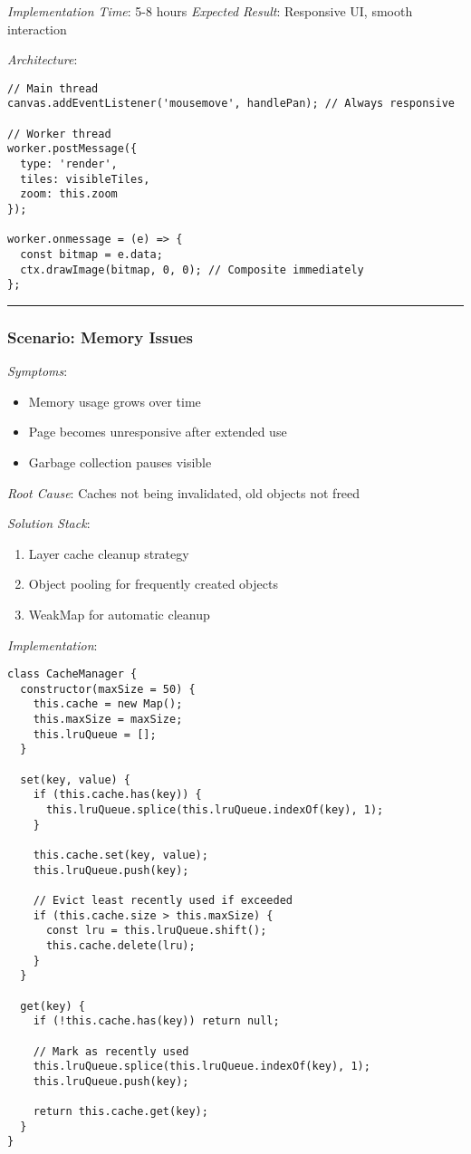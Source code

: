\documentclass[11pt]{article}
\begin{document}
\emph{Implementation Time}: 5-8 hours
\emph{Expected Result}: Responsive UI, smooth interaction

\emph{Architecture}:
\begin{verbatim}
// Main thread
canvas.addEventListener('mousemove', handlePan); // Always responsive

// Worker thread
worker.postMessage({ 
  type: 'render',
  tiles: visibleTiles,
  zoom: this.zoom
});

worker.onmessage = (e) => {
  const bitmap = e.data;
  ctx.drawImage(bitmap, 0, 0); // Composite immediately
};
\end{verbatim}

\noindent\rule{\textwidth}{0.5pt}
\subsubsection{Scenario: Memory Issues}
\label{sec:org7d0852e}

\emph{Symptoms}:
\begin{itemize}
\item Memory usage grows over time
\item Page becomes unresponsive after extended use
\item Garbage collection pauses visible
\end{itemize}

\emph{Root Cause}: Caches not being invalidated, old objects not freed

\emph{Solution Stack}:
\begin{enumerate}
\item Layer cache cleanup strategy
\item Object pooling for frequently created objects
\item WeakMap for automatic cleanup
\end{enumerate}

\emph{Implementation}:
\begin{verbatim}
class CacheManager {
  constructor(maxSize = 50) {
    this.cache = new Map();
    this.maxSize = maxSize;
    this.lruQueue = [];
  }
  
  set(key, value) {
    if (this.cache.has(key)) {
      this.lruQueue.splice(this.lruQueue.indexOf(key), 1);
    }
    
    this.cache.set(key, value);
    this.lruQueue.push(key);
    
    // Evict least recently used if exceeded
    if (this.cache.size > this.maxSize) {
      const lru = this.lruQueue.shift();
      this.cache.delete(lru);
    }
  }
  
  get(key) {
    if (!this.cache.has(key)) return null;
    
    // Mark as recently used
    this.lruQueue.splice(this.lruQueue.indexOf(key), 1);
    this.lruQueue.push(key);
    
    return this.cache.get(key);
  }
}
\end{verbatim}
\end{document}

